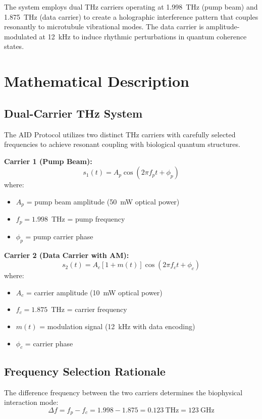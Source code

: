 The system employs dual THz carriers operating at 1.998~THz (pump beam) and 1.875~THz (data carrier) to create a holographic interference pattern that couples resonantly to microtubule vibrational modes. The data carrier is amplitude-modulated at 12~kHz to induce rhythmic perturbations in quantum coherence states.

\section{Mathematical Description}

\subsection{Dual-Carrier THz System}

The AID Protocol utilizes two distinct THz carriers with carefully selected frequencies to achieve resonant coupling with biological quantum structures.

\textbf{Carrier 1 (Pump Beam):}
\begin{equation}
s_1(t) = A_p \cos(2\pi f_p t + \phi_p)
\end{equation}
where:
\begin{itemize}
\item $A_p$ = pump beam amplitude (50~mW optical power)
\item $f_p = 1.998$~THz = pump frequency
\item $\phi_p$ = pump carrier phase
\end{itemize}

\textbf{Carrier 2 (Data Carrier with AM):}
\begin{equation}
s_2(t) = A_c [1 + m(t)] \cos(2\pi f_c t + \phi_c)
\end{equation}
where:
\begin{itemize}
\item $A_c$ = carrier amplitude (10~mW optical power)
\item $f_c = 1.875$~THz = carrier frequency
\item $m(t)$ = modulation signal (12~kHz with data encoding)
\item $\phi_c$ = carrier phase
\end{itemize}

\subsection{Frequency Selection Rationale}

The difference frequency between the two carriers determines the biophysical interaction mode:
\begin{equation}
\Delta f = f_p - f_c = 1.998 - 1.875 = 0.123~\text{THz} = 123~\text{GHz}
\end{equation}

